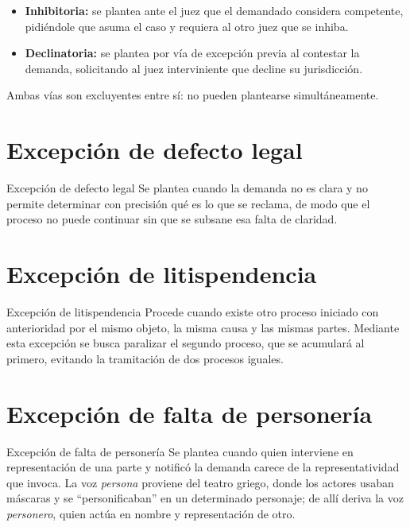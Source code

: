 \documentclass[12pt,oneside]{book}
\begin{document}
\begin{itemize}
    \item \textbf{Inhibitoria:} se plantea ante el juez que el demandado considera competente, pidiéndole que asuma el caso y requiera al otro juez que se inhiba.
    \item \textbf{Declinatoria:} se plantea por vía de excepción previa al contestar la demanda, solicitando al juez interviniente que decline su jurisdicción.
\end{itemize}

\begin{note}
Ambas vías son excluyentes entre sí: no pueden plantearse simultáneamente.
\end{note}

\section{Excepción de defecto legal}

\begin{definition}{Excepción de defecto legal}
Se plantea cuando la demanda no es clara y no permite determinar con precisión qué es lo que se reclama, de modo que el proceso no puede continuar sin que se subsane esa falta de claridad.
\end{definition}

\section{Excepción de litispendencia}

\begin{definition}{Excepción de litispendencia}
Procede cuando existe otro proceso iniciado con anterioridad por el mismo objeto, la misma causa y las mismas partes. Mediante esta excepción se busca paralizar el segundo proceso, que se acumulará al primero, evitando la tramitación de dos procesos iguales.
\end{definition}

\section{Excepción de falta de personería}

\begin{definition}{Excepción de falta de personería}
Se plantea cuando quien interviene en representación de una parte \textemdash{}y notificó la demanda\textemdash{} carece de la representatividad que invoca. La voz \emph{persona} proviene del teatro griego, donde los actores usaban máscaras y se ``personificaban'' en un determinado personaje; de allí deriva la voz \emph{personero}, quien actúa en nombre y representación de otro.
\end{definition}
\end{document}
